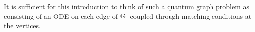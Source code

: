 It is sufficient for this introduction to think of such a quantum graph problem as consisting of an ODE on each edge of $\mathbb{G}$, coupled through matching conditions at the vertices.

